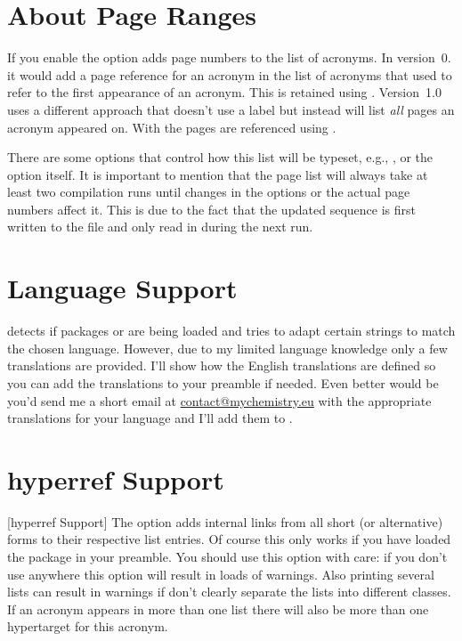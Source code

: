 \documentclass[DIV10,toc=index,toc=bib,hyperfootnotes=false]{cnpkgdoc}
\makeatletter
\newcommand\versionstar{\texorpdfstring{\@versionstar}{*}}
\makeatother
\begin{document}
\section{About Page Ranges}
If you enable the  option \acro adds page numbers to the list of
acronyms. In version~0.\versionstar{} it would add a page reference for an acronym
in the list of acronyms that used  to refer to the first appearance
of an acronym. This is retained using . Version~1.0 uses a
different approach that doesn't use a label but instead will list \emph{all}
pages an acronym appeared on. With  the pages are referenced
using .

There are some options that control how this list will be typeset, e.g.,
,  or the option  itself. It is
important to mention that the page list will always take at least two compilation
runs until changes in the options or the actual page numbers affect it. This is
due to the fact that the updated sequence is first written to the  file
and only read in during the next run.

\section{Language Support}
\acro detects if packages  or  are being loaded
and tries to adapt certain strings to match the chosen language. However, due
to my limited language knowledge only a few translations are provided. I'll
show how the English translations are defined so you can add the translations
to your preamble if needed. Even better would be you'd send me a short email
at \href{mailto:contact@mychemistry.eu}{contact@mychemistry.eu} with the
appropriate translations for your language and I'll add them to \acro.

\begin{beispiel}
\end{beispiel}

\section{hyperref Support}[hyperref Support]
The option  adds internal links from all short (or alternative)
forms to their respective list entries. Of course this only works if you have
loaded the  package in your preamble. You should use this option
with care: if you don't use  anywhere this option will result
in loads of  warnings. Also printing several lists can result in
warnings if don't clearly separate the lists into different classes. If an acronym
appears in more than one list there will also be more than one hypertarget for this
acronym.
\end{document}
